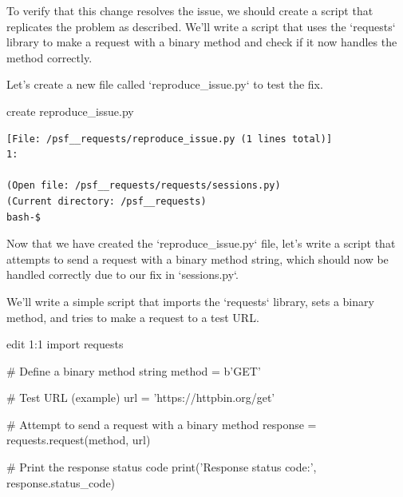 {\begin{agentbox}
To verify that this change resolves the issue, we should create a script that replicates the problem as described. We'll write a script that uses the `requests` library to make a request with a binary method and check if it now handles the method correctly.



Let's create a new file called `reproduce\_issue.py` to test the fix.

\hrulefill
\begin{CodeVerbatim}[breaklines=true, breakanywhere=true]
create reproduce_issue.py
\end{CodeVerbatim}
\end{agentbox}
\begin{observationbox}\begin{Verbatim}[breaklines=true, breakanywhere=true]
[File: /psf__requests/reproduce_issue.py (1 lines total)]
1:

(Open file: /psf__requests/requests/sessions.py)
(Current directory: /psf__requests)
bash-$
\end{Verbatim}
\end{observationbox}
\begin{agentbox}
Now that we have created the `reproduce\_issue.py` file, let's write a script that attempts to send a request with a binary method string, which should now be handled correctly due to our fix in `sessions.py`.



We'll write a simple script that imports the `requests` library, sets a binary method, and tries to make a request to a test URL.



\hrulefill
\begin{CodeVerbatim}[breaklines=true, breakanywhere=true]
edit 1:1
import requests

# Define a binary method string
method = b'GET'

# Test URL (example)
url = 'https://httpbin.org/get'

# Attempt to send a request with a binary method
response = requests.request(method, url)

# Print the response status code
print('Response status code:', response.status_code)


\end{CodeVerbatim}
\end{agentbox}}
